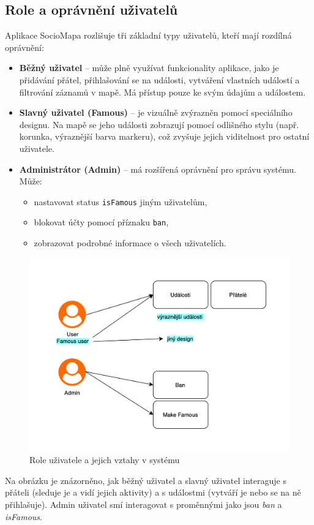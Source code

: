 \subsection{Role a oprávnění uživatelů}

Aplikace SocioMapa rozlišuje tři základní typy uživatelů, kteří mají rozdílná oprávnění:

\begin{itemize}
    \item \textbf{Běžný uživatel} – může plně využívat funkcionality aplikace, jako je přidávání přátel, přihlašování se na události, vytváření vlastních událostí a filtrování záznamů v mapě. Má přístup pouze ke svým údajům a událostem.
    
    \item \textbf{Slavný uživatel (Famous)} – je vizuálně zvýrazněn pomocí speciálního designu. Na mapě se jeho události zobrazují pomocí odlišného stylu (např. korunka, výraznější barva markeru), což zvyšuje jejich viditelnost pro ostatní uživatele. 
    
    \item \textbf{Administrátor (Admin)} – má rozšířená oprávnění pro správu systému. Může:
    \begin{itemize}
        \item nastavovat status \texttt{isFamous} jiným uživatelům,
        \item blokovat účty pomocí příznaku \texttt{ban},
        \item zobrazovat podrobné informace o všech uživatelích.
    \end{itemize}
\end{itemize}

\begin{figure}
    \centering
    \includegraphics[width = \textwidth]{Images/User_relations.drawio.png}
    \caption{Role uživatele a jejich vztahy v systému}
    \label{fig:Update-account}
\end{figure}

Na obrázku je znázorněno, jak běžný uživatel a slavný uživatel interaguje s přáteli (sleduje je a vidí jejich aktivity) a s událostmi (vytváří je nebo se na ně přihlašuje). Admin uživatel smí interagovat s proměnnými jako jsou \textit{ban} a \textit{isFamous}.






